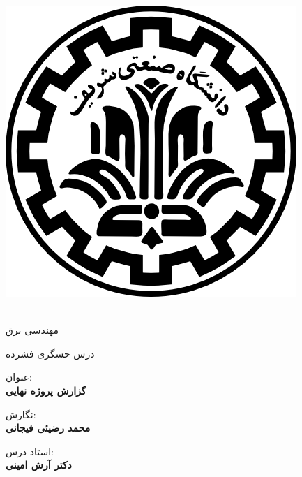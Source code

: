 
\pagestyle{empty}

\begin{center}

\includegraphics[scale=0.2]{front/template/images/logo.png}

\begin{large}

\vspace{-0.2cm}
\ThesisUniversity \\[-0.3em]
مهندسی برق

\vspace{0.5cm}

درس حسگری فشرده

\end{large}

\vspace{1cm}

{عنوان:}\\[1.2em]
{\LARGE\textbf{گزارش پروژه نهایی}}

\vspace{1cm}

{نگارش:}\\[.5em]
{\large\textbf{محمد رضیئی فیجانی}}

\vspace{0.7cm}

{استاد درس:}\\[.5em]
{\large\textbf{دکتر آرش امینی}}

\vspace{1.3cm}

\ThesisDate

\end{center}

\newpage
